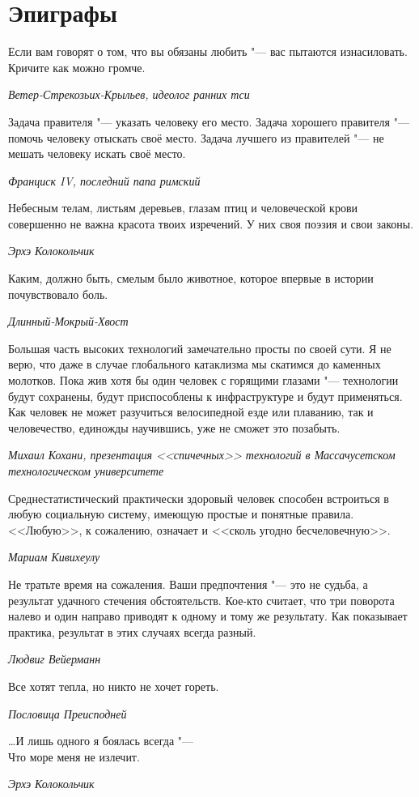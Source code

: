 \documentclass[a4paper,10pt]{book}
\begin{document}
 \tableofcontents

 
 
\chapter{Эпиграфы}

\epigraph{Если вам говорят о том, что вы обязаны любить "--- вас пытаются изнасиловать. Кричите как можно громче.}
{\textit{Ветер-Стрекозьих-Крыльев, идеолог ранних тси}}

\epigraph{Задача правителя "--- указать человеку его место.
Задача хорошего правителя "--- помочь человеку отыскать своё место.
Задача лучшего из правителей "--- не мешать человеку искать своё место.}
{\textit{Франциск IV, последний папа римский}}

\epigraph{Небесным телам, листьям деревьев, глазам птиц и человеческой крови совершенно не важна красота твоих изречений.
У них своя поэзия и свои законы.}
{\textit{Эрхэ Колокольчик}}

\epigraph{Каким, должно быть, смелым было животное, которое впервые в истории почувствовало боль.}
{\textit{Длинный-Мокрый-Хвост}}

\epigraph{Большая часть высоких технологий замечательно просты по своей сути.
Я не верю, что даже в случае глобального катаклизма мы скатимся до каменных молотков.
Пока жив хотя бы один человек с горящими глазами "--- технологии будут сохранены, будут приспособлены к инфраструктуре и будут применяться.
Как человек не может разучиться велосипедной езде или плаванию, так и человечество, единожды научившись, уже не сможет это позабыть.}
{\textit{Михаил Кохани, презентация <<спичечных>> технологий в Массачусетском технологическом университете}}

\epigraph{Среднестатистический практически здоровый человек способен встроиться в любую социальную систему, имеющую простые и понятные правила. <<Любую>>, к сожалению, означает и <<сколь угодно бесчеловечную>>.}
{\textit{Мариам Кивихеулу}}

\epigraph{Не тратьте время на сожаления. Ваши предпочтения "--- это не судьба, а результат удачного стечения обстоятельств. Кое-кто считает, что три поворота налево и один направо приводят к одному и тому же результату. Как показывает практика, результат в этих случаях всегда разный.}
{\textit{Людвиг Вейерманн}}

\epigraph{Все хотят тепла, но никто не хочет гореть.}
{\textit{Пословица Преисподней}}

\epigraph{\dots И лишь одного я боялась всегда "---\\Что море меня не излечит.}
{\textit{Эрхэ Колокольчик}}
\end{document}
